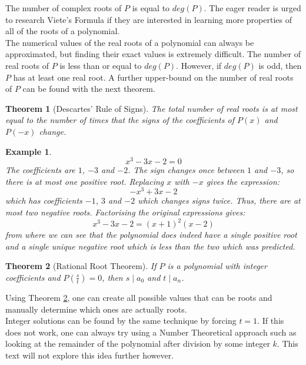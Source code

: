 \documentclass[a4paper,12pt]{article}
\newtheorem{example}{Example}[section]
\newtheorem{theorem}{Theorem}[section]
\begin{document}
The number of complex roots of $P$ is equal to $deg(P)$. The eager reader is urged to research Viete's Formula if they are interested in learning more properties of all of the roots of a polynomial. \\

The numerical values of the real roots of a polynomial can always be approximated, but finding their exact values is extremely difficult. The number of real roots of $P$ is less than or equal to $deg(P)$. However, if $deg(P)$ is odd, then $P$ has at least one real root. A further upper-bound on the number of real roots of $P$ can be found with the next theorem. 

\begin{theorem}[Descartes' Rule of Signs]
The total number of real roots is at most equal to the number of times that the signs of the coefficients of $P(x)$ and $P(-x)$ change.\\
\end{theorem}

\begin{example}
    $$x^3 - 3x - 2 = 0$$
    The coefficients are $1$, $-3$ and $-2$. The sign changes once between $1$ and $-3$, so there is at most one positive root. Replacing $x$ with $-x$ gives the expression:
    $$-x^3 + 3x - 2$$
    which has coefficients $-1$, $3$ and $-2$ which changes signs twice. Thus, there are at most two negative roots. Factorising the original expressions gives:
    $$x^3 - 3x - 2 = (x + 1)^2(x - 2)$$
    from where we can see that the polynomial does indeed have a single positive root and a single unique negative root which is less than the two which was predicted.
\end{example}

\begin{theorem}[Rational Root Theorem] 
    \label{rationalrootthm}
    If $P$ is a polynomial with integer coefficients and $P(\frac{s}{t}) = 0$, then $s\; |\; a_0$ and $t\; |\; a_n$.
\end{theorem}

Using Theorem \ref{rationalrootthm}, one can create all possible values that can be roots and manually determine which ones are actually roots.\\
Integer solutions can be found by the same technique by forcing $t = 1$. If this does not work, one can always try using a Number Theoretical approach such as looking at the remainder of the polynomial after division by some integer $k$. This text will not explore this idea further however.
\end{document}
